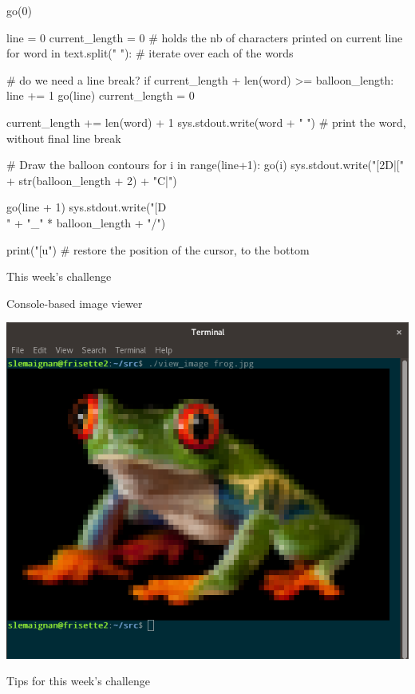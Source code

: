 \documentclass[compress]{beamer}
\begin{document}
\begin{frame}[fragile]{}
\begin{pythoncode}
go(0)

line = 0
current_length = 0 # holds the nb of characters printed on current line
for word in text.split(" "): # iterate over each of the words 

    # do we need a line break?
    if current_length + len(word) >= balloon_length:
        line += 1
        go(line)
        current_length = 0

    current_length += len(word) + 1
    sys.stdout.write(word + " ") # print the word, without final line break

# Draw the balloon contours
for i in range(line+1):
    go(i)
    sys.stdout.write("[2D|[" + str(balloon_length + 2) + "C|")

go(line + 1)
sys.stdout.write("[D\\" + "_" * balloon_length + "/")

print("[u") # restore the position of the cursor, to the bottom
\end{pythoncode}


\end{frame}

\begin{frame}[fragile]{This week's challenge}

    \Large
    Console-based image viewer

        \begin{center}
            \includegraphics[width=0.7\linewidth]{coding-challenge-terminal-image}
        \end{center}

\end{frame}

\begin{frame}[fragile]{Tips for this week's challenge}

\end{frame}
\end{document}
